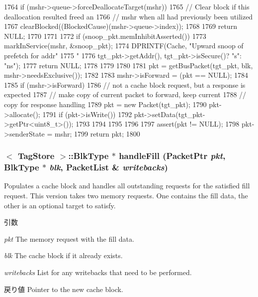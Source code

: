 \begin{DoxyCode}
{{{{1764                 if (mshr->queue->forceDeallocateTarget(mshr)) {
1765                     // Clear block if this deallocation resulted freed an
1766                     // mshr when all had previously been utilized
1767                     clearBlocked((BlockedCause)(mshr->queue->index));
1768                 }
1769                 return NULL;
1770             }
1771 
1772             if (snoop_pkt.memInhibitAsserted()) {
1773                 markInService(mshr, &snoop_pkt);
1774                 DPRINTF(Cache, "Upward snoop of prefetch for addr"
1775                         " %
1776                         tgt_pkt->getAddr(), tgt_pkt->isSecure()? "s": "ns");
1777                 return NULL;
1778             }
1779         }
1780 
1781         pkt = getBusPacket(tgt_pkt, blk, mshr->needsExclusive());
1782 
1783         mshr->isForward = (pkt == NULL);
1784 
1785         if (mshr->isForward) {
1786             // not a cache block request, but a response is expected
1787             // make copy of current packet to forward, keep current
1788             // copy for response handling
1789             pkt = new Packet(tgt_pkt);
1790             pkt->allocate();
1791             if (pkt->isWrite()) {
1792                 pkt->setData(tgt_pkt->getPtr<uint8_t>());
1793             }
1794         }
1795     }
1796 
1797     assert(pkt != NULL);
1798     pkt->senderState = mshr;
1799     return pkt;
1800 }
\end{DoxyCode}
\hypertarget{classCache_a4943b9a8a4801f454a968416b456dc21}{
\subsubsection[{handleFill}]{$<$ TagStore $>$::{\bf BlkType} $\ast$ handleFill ({\bf PacketPtr} {\em pkt}, \/  {\bf BlkType} $\ast$ {\em blk}, \/  {\bf PacketList} \& {\em writebacks})}}
\label{classCache_a4943b9a8a4801f454a968416b456dc21}
Populates a cache block and handles all outstanding requests for the satisfied fill request. This version takes two memory requests. One contains the fill data, the other is an optional target to satisfy. 
\begin{DoxyParams}{引数}
\item[{\em pkt}]The memory request with the fill data. \item[{\em blk}]The cache block if it already exists. \item[{\em writebacks}]List for any writebacks that need to be performed. \end{DoxyParams}
\begin{DoxyReturn}{戻り値}
Pointer to the new cache block. 
\end{DoxyReturn}



